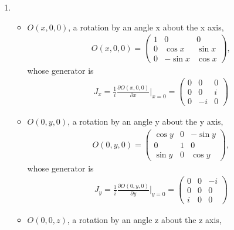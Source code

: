 \documentclass[11pt]{article}
\def\del{{\partial}}
\begin{document}
\section{ }

\begin{enumerate}
    \item 
    \begin{itemize}
        \item $O(x,0,0)$, a rotation by an angle x about the x axis,
        \begin{eqnarray}
            O(x,0,0)=
            \begin{pmatrix}
                1& 0         & 0\\
                0&\cos x & \sin x\\
                0&-\sin x & \cos x 
            \end{pmatrix},
        \end{eqnarray}
        whose generator is
        \begin{eqnarray}
            J_x=\frac{1}{i}\frac{\del O(x,0,0)}{\del x}|_{x=0} =
            \begin{pmatrix}
                0&0&0\\
                0&0&i\\
                0&-i&0
            \end{pmatrix} 
        \end{eqnarray}
        \item $O(0,y,0)$, a rotation by an angle y about the y axis,
        \begin{eqnarray}
            O(0,y,0)=
            \begin{pmatrix}
                \cos y& 0    & -\sin y\\
                0&1 & 0\\
                \sin y&0 & \cos y
            \end{pmatrix},
        \end{eqnarray}
        whose generator is
        \begin{eqnarray}
            J_y=\frac{1}{i}\frac{\del O(0,y,0)}{\del y}|_{y=0} =
            \begin{pmatrix}
                0&0&-i\\
                0&0&0\\
                i&0&0
            \end{pmatrix} 
        \end{eqnarray}
        \item $O(0,0,z)$, a rotation by an angle z about the z axis,

\end{itemize}
\end{enumerate}
\end{document}
